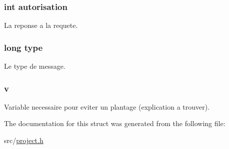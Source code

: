 \subsubsection[{autorisation}]{\setlength{\rightskip}{0pt plus 5cm}int autorisation}\label{struct_reponse_a9ae59baa7d0f7ac15cc2090faf0b5b43}
La reponse a la requete. \hypertarget{struct_reponse_a6a83a8677f7c78fd146859325e08209a}{}
\subsubsection[{type}]{\setlength{\rightskip}{0pt plus 5cm}long type}\label{struct_reponse_a6a83a8677f7c78fd146859325e08209a}
Le type de message. \hypertarget{struct_reponse_a76a64000aab59dcc4195c1b6e1605eb3}{}
\subsubsection[{v}]{ v}\label{struct_reponse_a76a64000aab59dcc4195c1b6e1605eb3}
Variable necessaire pour eviter un plantage (explication a trouver). 

The documentation for this struct was generated from the following file\+:\begin{DoxyCompactItemize}
\item 
src/\hyperlink{project_8h}{project.\+h}\end{DoxyCompactItemize}
